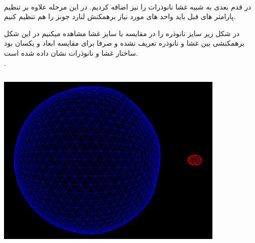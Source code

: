 \documentclass[12pt,onecolumn,a4paper]{report}
\begin{document}
{\\
در قدم بعدی به شبیه غشا نانوذرات را نیز اضافه کردیم. در این مرحله علاوه بر تنظیم پارامتر های فبل باید واحد های مورد نیاز برهمکنش لنارد جونز را هم تنظیم کنیم.

در شکل زیر سایز نانوذره را در مقایسه با سایز غشا مشاهده میکنیم
در این شکل برهمکنشی بین غشا و نانوذره تعریف نشده و صرفا برای مقایسه ابعاد و یکسان بود ساختار غشا و نانوذرات نشان داده شده است.
\\.
\begin{center}
\includegraphics[width=11cm, height=9cm]{20210209_195305.png}
\end{center}\\

}
\end{document}

